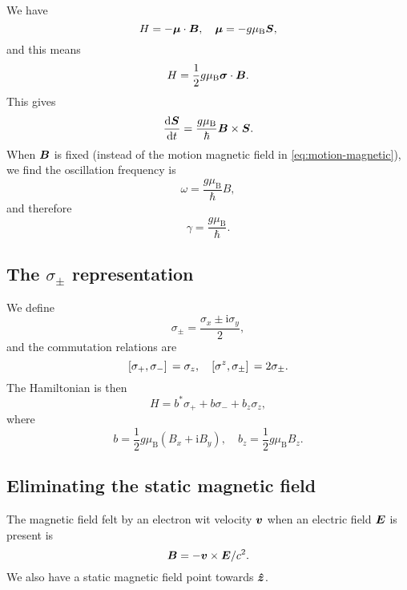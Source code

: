 \documentclass[hyperref, a4paper]{article}
\newcommand*{\ii}{\mathrm{i}}
\newcommand*{\muB}{\mu_{\text{B}}}
\begin{document}
We have 
\begin{equation}
    H = - \vb*{\mu} \cdot \vb*{B}, \quad \vb*{\mu} = - g \muB \vb*{S},
\end{equation}
and this means 
\begin{equation}
    H = \frac{1}{2} g \muB \vb*{\sigma} \cdot \vb*{B}.
\end{equation}
This gives
\begin{equation}
    \dv{\vb*{S}}{t} = \frac{g \muB}{\hbar} \vb*{B} \times \vb*{S}.
\end{equation}
When $\vb*{B}$ is fixed (instead of the motion magnetic field in \eqref{eq:motion-magnetic}),
we find the oscillation frequency is 
\begin{equation}
    \omega = \frac{g \muB}{\hbar} B,
\end{equation}
and therefore 
\begin{equation}
    \gamma = \frac{g \muB}{\hbar}.
\end{equation}

\subsection{The $\sigma_{\pm}$ representation}

We define 
\begin{equation}
    \sigma_\pm = \frac{\sigma_x \pm \ii \sigma_y}{2}, 
\end{equation}
and the commutation relations are 
\begin{equation}
    \comm*{\sigma_+}{\sigma_-} =  \sigma_z, \quad 
    \comm*{\sigma^z}{\sigma_\pm} = 2 \sigma_\pm.
\end{equation}
The Hamiltonian is then 
\begin{equation}
    H = b^* \sigma_+ + b \sigma_- + b_z \sigma_z, 
\end{equation}
where 
\begin{equation}
    b = \frac{1}{2} g \muB (B_x + \ii B_y), \quad 
    b_z = \frac{1}{2} g \muB B_z.
\end{equation}

\subsection{Eliminating the static magnetic field}

The magnetic field felt by an electron wit velocity $\vb*{v}$ 
when an electric field $\vb*{E}$ is present is 
\begin{equation}
    \vb*{B}=-\vb*{v} \times \vb*{E} / c^2.
    \label{eq:motion-magnetic}
\end{equation}
We also have a static magnetic field point towards $\vu*{z}$.
\end{document}
